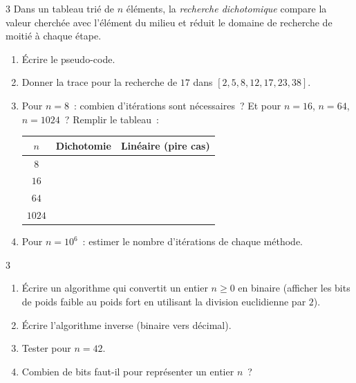 \begin{exo}{3}
Dans un tableau tri\'e de $n$ \'el\'ements, la \emph{recherche dichotomique}
compare la valeur cherch\'ee avec l'\'el\'ement du milieu et r\'eduit le
domaine de recherche de moiti\'e \`a chaque \'etape.
\begin{enumerate}
  \item \'Ecrire le pseudo-code.
  \item Donner la trace pour la recherche de $17$ dans
        $[2, 5, 8, 12, 17, 23, 38]$.
  \item Pour $n=8$~: combien d'it\'erations sont n\'ecessaires~?
        Et pour $n=16$, $n=64$, $n=1024$~? Remplir le tableau~:
        \begin{center}
        \renewcommand{\arraystretch}{1.3}
        \begin{tabular}{|c|c|c|}
        \hline
        \rowcolor{BN!10}$n$ & Dichotomie & Lin\'eaire (pire cas) \\ \hline
        $8$ & & \\ $16$ & & \\ $64$ & & \\ $1024$ & & \\ \hline
        \end{tabular}
        \end{center}
  \item Pour $n = 10^6$~: estimer le nombre d'it\'erations de chaque m\'ethode.

\end{enumerate}
\end{exo}

\begin{exo}{3}
\begin{enumerate}
  \item \'Ecrire un algorithme qui convertit un entier $n \geq 0$ en binaire
        (afficher les bits de poids faible au poids fort en utilisant
        la division euclidienne par $2$).
  \item \'Ecrire l'algorithme inverse (binaire vers d\'ecimal).
  \item Tester pour $n = 42$.
  \item Combien de bits faut-il pour repr\'esenter un entier $n$~?
\end{enumerate}
\end{exo}

